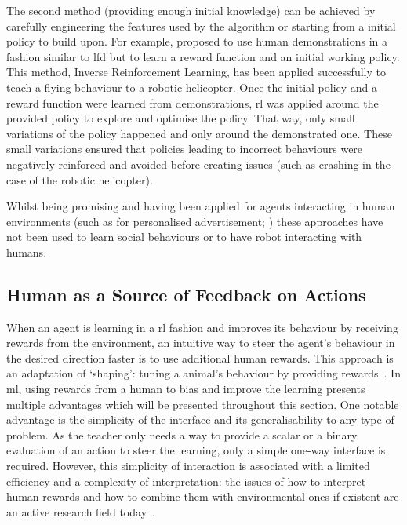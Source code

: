 The second method (providing enough initial knowledge) can be achieved by carefully engineering the features used by the algorithm or starting from a initial policy to build upon. For example, \cite{abbeel2004apprenticeship} proposed to use human demonstrations in a fashion similar to \gls{lfd} but to learn a reward function and an initial working policy. This method, Inverse Reinforcement Learning, has been applied successfully to teach a flying behaviour to a robotic helicopter. Once the initial policy and a reward function were learned from demonstrations, \gls{rl} was applied around the provided policy to explore and optimise the policy. That way, only small variations of the policy happened and only around the demonstrated one. These small variations ensured that policies leading to incorrect behaviours were negatively reinforced and avoided before creating issues (such as crashing in the case of the robotic helicopter). 

Whilst being promising and having been applied for agents interacting in human environments (such as for personalised advertisement;  \citealt{theocharous2015personalized})	these approaches have not been used to learn social behaviours or to have robot interacting with humans.

\subsection{Human as a Source of Feedback on Actions} \label{ssec:back_feedback}

When an agent is learning in a \gls{rl} fashion and improves its behaviour by receiving rewards from the environment, an intuitive way to steer the agent's behaviour in the desired direction faster is to use additional human rewards. This approach is an adaptation of `shaping': tuning a animal's behaviour by providing rewards~\citep{bouton2007learning}. In \gls{ml}, using rewards from a human to bias and improve the learning presents multiple advantages which will be presented throughout this section. One notable advantage is the simplicity of the interface and its generalisability to any type of problem. As the teacher only needs a way to provide a scalar or a binary evaluation of an action to steer the learning, only a simple one-way interface is required.  However, this simplicity of interaction is associated with a limited efficiency and a complexity of interpretation: the issues of how to interpret human rewards and how to combine them with environmental ones if existent are an active research field today~\citep{knox2010combining}.

